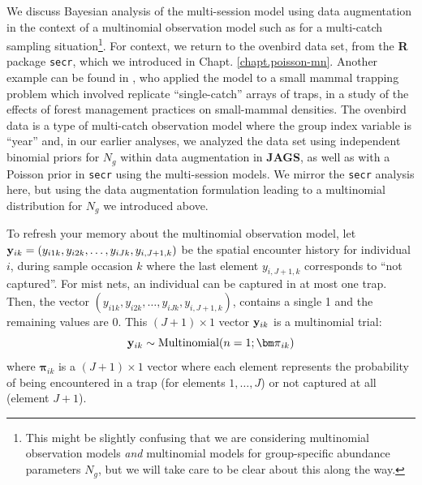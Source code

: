 We discuss Bayesian analysis of the multi-session model using data
augmentation in the context of a multinomial observation model such as
for a multi-catch sampling situation\footnote{This might be slightly
  confusing that we are considering multinomial observation models
  {\it and} multinomial models for group-specific abundance parameters
  $N_{g}$, but we will take care to be clear about this along the
  way.}.  For context, we return to the ovenbird data set, from the
{\bf R} package \mbox{\tt secr}, which we introduced in
Chapt. \ref{chapt.poisson-mn}.  Another example can be found in
\citet{royle_converse:2013}, who applied the model to a small mammal
trapping problem which involved replicate ``single-catch'' arrays of
traps, in a study of the effects of forest management practices on
small-mammal densities.  The ovenbird data is a type of multi-catch
observation model where the group index variable is ``year'' and, in
our earlier analyses, we analyzed the data set using independent
binomial priors for $N_{g}$ within data augmentation in {\bf JAGS}, as
well as with a Poisson prior in \mbox{\tt secr} using the
multi-session models.  We mirror the \mbox{\tt secr} analysis here,
but using the data augmentation formulation leading to a multinomial
distribution for $N_{g}$ we introduced above.


To refresh your memory about the multinomial observation model, let
${\bf y}_{ik} = (y_{i1k}, y_{i2k}, \ldots, y_{iJk}, y_{i,J+1,k})$ be the
spatial encounter history for individual $i$, during sample occasion
$k$ where the last element $y_{i,J+1,k}$ corresponds to ``not
captured''.  For mist nets, an individual can be captured in at most
one trap. Then, the vector
$(y_{i1k},y_{i2k},\ldots,y_{iJk},y_{i,J+1,k})$, contains a single 1
and the remaining values are 0.  This $(J+1)\times 1$ vector ${\bf
  y}_{ik}$ is a multinomial trial:
\[
{\bf y}_{ik} \sim \mbox{Multinomial}(n=1; {\bm \pi}_{ik} )
\]
where ${\bm \pi}_{ik}$ is a $(J+1) \times 1$ vector where each element
represents the probability of being encountered in a trap (for
elements $1,\ldots,J$) or not captured at all (element $J+1$).

